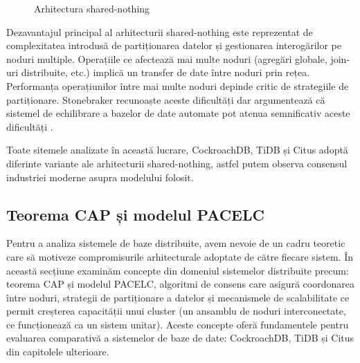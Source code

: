 \begin{figure}[!htbp]
    \centering
    \caption{Arhitectura shared-nothing}
    \label{fig:shared-nothing}
\end{figure}

Dezavantajul principal al arhitecturii shared-nothing este reprezentat de complexitatea introdusă de partiționarea datelor și gestionarea interogărilor pe noduri multiple. Operațiile ce afectează mai multe noduri (agregări globale, join-uri distribuite, etc.) implică un transfer de date între noduri prin rețea. Performanța operațiunilor între mai multe noduri depinde critic de strategiile de partiționare. Stonebraker recunoaște aceste dificultăți dar argumentează că sistemel de echilibrare a bazelor de date automate pot atenua semnificativ aceste dificultăți \cite{stonebraker1986}.

Toate sitemele analizate în această lucrare, CockroachDB, TiDB și Citus adoptă diferinte variante ale arhitecturii shared-nothing, astfel putem observa consensul industriei moderne asupra modelului folosit.

\subsection{Teorema CAP și modelul PACELC}

Pentru a analiza sistemele de baze distribuite, avem nevoie de un cadru teoretic care să motiveze compromisurile arhitecturale adoptate de către fiecare sistem. În această secțiune examinăm concepte din domeniul sistemelor distribuite precum: teorema CAP și modelul PACELC, algoritmi de consens care asigură coordonarea între noduri, strategii de partiționare a datelor și mecanismele de scalabilitate ce permit creșterea capacității unui cluster (un ansamblu de noduri interconectate, ce funcționează ca un sistem unitar). Aceste concepte oferă fundamentele pentru evaluarea comparativă a sistemelor de baze de date: CockroachDB, TiDB și Citus din capitolele ulterioare.

